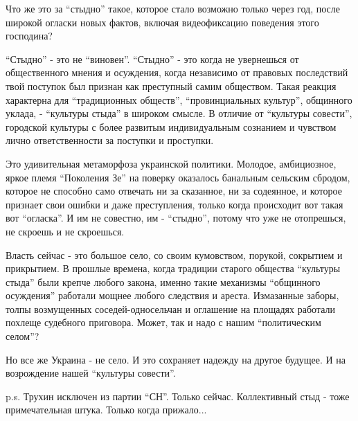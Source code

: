 Что же это за \enquote{стыдно} такое, которое стало возможно только через год, после
широкой огласки новых фактов, включая видеофиксацию поведения этого господина?

\enquote{Стыдно} - это не \enquote{виновен}. \enquote{Стыдно} - это когда не увернешься от
общественного мнения и осуждения, когда независимо от правовых последствий твой
поступок был признан как преступный самим обществом. Такая реакция характерна
для \enquote{традиционных обществ}, \enquote{провинциальных культур}, общинного уклада, -
\enquote{культуры стыда} в широком смысле. В отличие от \enquote{культуры совести}, городской
культуры с более развитым индивидуальным сознанием и чувством лично
ответственности за поступки и проступки. 

Это удивительная метаморфоза украинской политики. Молодое, амбициозное, яркое
племя \enquote{Поколения Зе} на поверку оказалось банальным сельским сбродом, которое
не способно само отвечать ни за сказанное, ни за содеянное, и которое признает
свои ошибки и даже преступления, только когда происходит вот такая вот
\enquote{огласка}. И им не совестно, им - \enquote{стыдно}, потому что уже не отопрешься, не
скроешь и не скроешься. 

Власть сейчас - это большое село, со своим кумовством, порукой, сокрытием и
прикрытием. В прошлые времена, когда традиции старого общества \enquote{культуры стыда}
были крепче любого закона, именно такие механизмы \enquote{общинного осуждения}
работали мощнее любого следствия и ареста. Измазанные заборы, толпы возмущенных
соседей-односельчан и оглашение на площадях работали похлеще судебного
приговора. Может, так и надо с нашим \enquote{политическим селом}?

Но все же Украина - не село. И это сохраняет надежду на другое будущее. И на
возрождение нашей \enquote{культуры совести}.

p.s. Трухин исключен из партии \enquote{СН}. Только сейчас. Коллективный стыд - тоже
примечательная штука. Только когда прижало...
